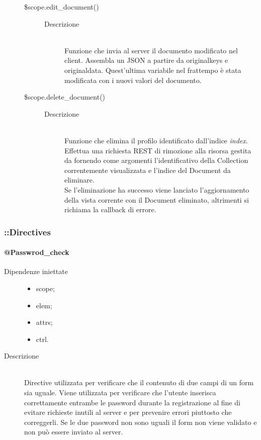 \begin{description}
\begin{description}
\begin{description}
    \end{description}
 

  \item[\$scope.edit\_document()] \hfill
  \begin{description}
   	\item[Descrizione] \hfill \\
  Funzione che invia al server il documento modificato nel client.
  Assembla un JSON a partire da original\textunderscore keys e original\textunderscore data. Quest'ultima variabile nel frattempo è stata modificata con i nuovi valori del documento.
    \end{description}

  \item[\$scope.delete\_document()] \hfill
    \begin{description}
  	\item[Descrizione] \hfill \\ 
 Funzione che elimina il profilo identificato dall'indice \textit{index}. Effettua una richiesta REST di rimozione alla risorsa gestita da  fornendo come argomenti l'identificativo della Collection correntemente visualizzata e l'indice del Document da eliminare. \\
  Se l'eliminazione ha successo viene lanciato l'aggiornamento della vista corrente con il Document eliminato, altrimenti si richiama la callback di errore.
      \end{description}
 \end{description}
\end{description}

\subsubsection{::Directives}

\paragraph{@Passwrod\_check}
\begin{description}
\item [Dipendenze iniettate] \hfill
\begin{itemize}
	\item scope;
	\item elem;
	\item attrs;	
	\item ctrl.
\end{itemize}
 \item[Descrizione] \hfill \\
 Directive utilizzata per verificare che il contenuto di due campi di un form sia uguale.
 Viene utilizzata per verificare che l'utente inserisca correttamente entrambe le password durante la registrazione al fine di evitare richieste inutili al server e per prevenire errori piuttosto che correggerli.
 Se le due password non sono uguali il form non viene validato e non può essere inviato al server.

\end{description}


